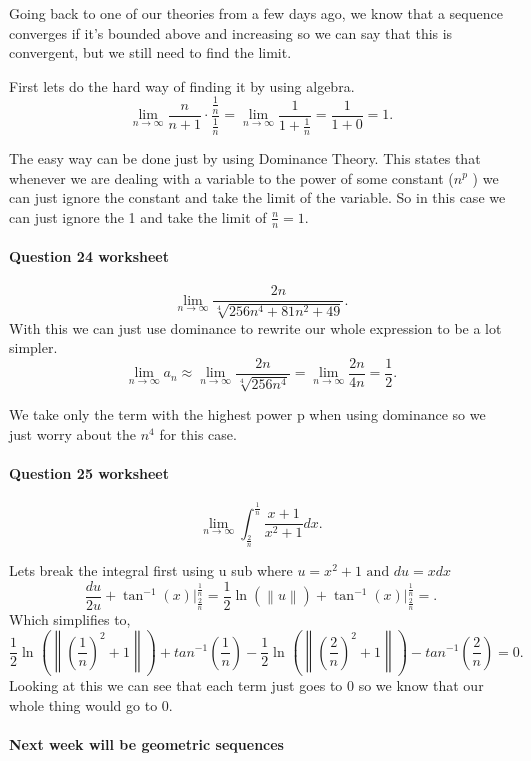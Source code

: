 Going back to one of our theories from a few days ago, we know that a sequence converges if it's bounded above and increasing so we can say that this is convergent, but we still need to find the limit.

First lets do the hard way of finding it by using algebra. 
\[
\lim_{ n \to \infty} \frac{ n }{ n+1 } \cdot \frac{ \frac{ 1 }{ n }  }{ \frac{ 1 }{ n }  }= \lim_{ n \to \infty} \frac{ 1 }{ 1+\frac{ 1 }{ n }  }= \frac{ 1 }{ 1+0 } =1
.\] 

The easy way can be done just by using Dominance Theory. This states that whenever we are dealing with a variable to the power of some constant ($ n^{ p } $ ) we can just ignore the constant and take the limit of the variable. So in this case we can just ignore the 1 and take the limit of $ \frac{ n }{ n } =1$.
\newpage
\paragraph{Question 24 worksheet}
\[
\lim_{ n \to \infty} \frac{ 2n }{ \sqrt[ 4 ]{ 256n^{ 4 }+81n^2+49 }  }
.\] 
With this we can just use dominance to rewrite our whole expression to be a lot simpler. 
\[
\lim_{ n \to \infty} a_n \approx \lim_{ n \to \infty} \frac{ 2n }{ \sqrt[ 4 ]{ 256n^{ 4 } }  } =\lim_{ n \to \infty} \frac{ 2n }{ 4n } =\frac{ 1 }{ 2 } 
.\] 

We take only the term with the highest power p when using dominance so we just worry about the $ n^{ 4 } $ for this case.

\paragraph{Question 25 worksheet}
\[
\lim_{ n \to \infty} \int_{ \frac{ 2 }{ n }  }^{ \frac{ 1 }{ n }  } \frac{ x+1 }{ x^2+1 }dx
.\] 

Lets break the integral first using u sub where $ u=x^2+1 \text{ and }du=xdx $ 
\[
 \frac{ du }{ 2u } +\tan^{-1}\left( x \right) \Big|_{ \frac{ 2 }{ n }  }^{ \frac{ 1 }{ n }  } =\frac{ 1 }{ 2 } \ln\left( \left\| u \right\| \right) +\tan^{-1}\left( x \right) \Big|_{ \frac{ 2 }{ n }  }^{ \frac{ 1 }{ n }  }=
.\] 
Which simplifies to,
\[
\frac{ 1 }{ 2 } \ln^{  } \left( \left\| \left( \frac{ 1 }{ n }  \right) ^2 +1\right\| \right) + tan^{ -1 }\left( \frac{ 1 }{ n }  \right) -\frac{ 1 }{ 2 } \ln^{  } \left( \left\| \left( \frac{ 2 }{ n }  \right) ^2 +1\right\| \right) - tan^{ -1 }\left( \frac{ 2 }{ n }  \right) =0
.\] 
Looking at this we can see that each term just goes to 0 so we know that our whole thing would go to 0. 

\paragraph{Next week will be geometric sequences}


